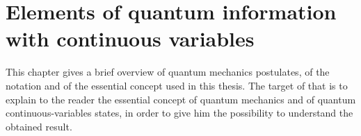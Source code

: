 \chapter{Elements of quantum information with continuous variables}
    This chapter gives a brief overview of quantum mechanics postulates,
    of the notation and of the essential concept used in this thesis. 
    The target of that is to explain to the reader the essential concept of quantum mechanics
    and of quantum continuous-variables states, in 
    order to give him the possibility to understand the obtained result.

    



    
    
    

    

